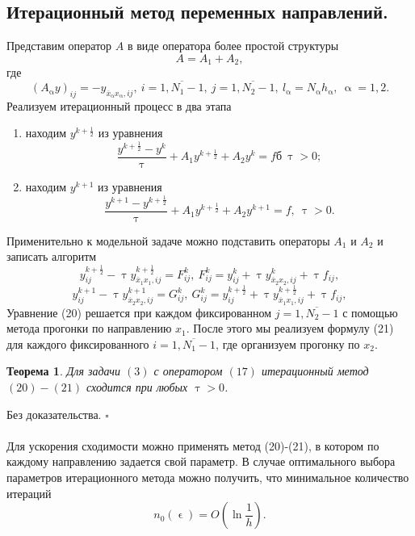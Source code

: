 \documentclass[a4paper, 12pt]{report}
\numberwithin{equation}{section}
\newenvironment{Proof} %
{\par\noindent{$\blacklozenge$}} %
{\hfill$\scriptstyle\square$}
\newcommand{\ol}{\overline}
\renewcommand{\alpha}{\upalpha}
\renewcommand{\tau}{\uptau}
\renewcommand{\epsilon}{\upvarepsilon}
\newtheorem*{theorem}{Теорема}
\begin{document}
	\subsection{Итерационный метод переменных направлений.}
	Представим оператор $A$ в виде оператора более простой структуры
	\begin{equation}
		A = A_1 + A_2,
	\end{equation}
	где $$(A_\alpha y) _{ij} = - y_{\ol{x}_\alpha x_\alpha, ij},\ i = \ol{1, N_1 - 1},\ j = \ol{1, N_2 - 1},\ l_\alpha = N_\alpha h_\alpha,\ \alpha = 1,2.$$
	Реализуем итерационный процесс в два этапа
	\begin{enumerate}
		\item находим $y^{k+\frac 12}$ из уравнения
		\begin{equation}
			\dfrac{y^{k+\frac 12} - y^k}{\tau} + A_1 y^{k+\frac 12} + A_2 y^k = fб \ \tau > 0;
		\end{equation}
		\item находим $y^{k+1}$ из уравнения
		\begin{equation}
			\dfrac{y^{k+1} - y^{k+\frac 12}}{\tau} + A_1 y^{k+\frac 12} + A_2 y^{k+1} = f,\ \tau > 0.
		\end{equation}
	\end{enumerate}
	Применительно к модельной задаче можно подставить операторы $A_1$ и $A_2$ и записать алгоритм
	\begin{equation}
		y_{ij}^{k+\frac 12} - \tau y_{\ol {x}_1 x_1,ij}^{k+\frac 12} = F_{ij}^k,\ F_{ij}^k = y_{ij}^k + \tau y_{\ol x_2 x_2 , ij}^k + \tau f_{ij},
	\end{equation}
	\begin{equation}
		y_{ij}^{k+1} - \tau y_{\ol {x}_2 x_2, ij}^{k+1} = G_{ij}^k,\ G_{ij}^k = y_{ij}^{k+\frac 12} + \tau y_{\ol x_1 x_1 , ij}^{k+\frac 12} + \tau f_{ij},
	\end{equation}
	Уравнение (20) решается при каждом фиксированном $j = \ol{1, N_2 - 1}$ с помощью метода прогонки по направлению $x_1$. После этого мы реализуем формулу (21) для каждого фиксированного $i = \ol{1, N_1 - 1}$, где организуем прогонку по $x_2$.
	\begin{theorem}
		Для задачи $(3)$ с оператором $(17)$ итерационный метод $(20)-(21)$ сходится при любых $\tau>0$.
	\end{theorem}
	\begin{Proof}
		Без доказательства.
	\end{Proof}\\\\
	Для ускорения сходимости можно применять метод (20)-(21), в котором по каждому направлению задается свой параметр. В случае оптимального выбора параметров итерационного метода можно получить, что минимальное количество итераций
	$$n_0(\epsilon) = O\left(\ln \dfrac 1h\right).$$
		
\end{document}
